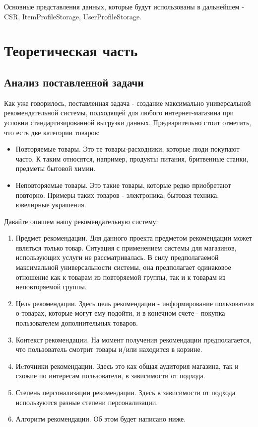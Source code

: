 \documentclass[14pt]{mmcs_article}
\begin{document}
Основные представления данных, которые будут использованы в дальнейшем - CSR, ItemProfileStorage, UserProfileStorage.



\section{Теоретическая часть}\label{dsfs}
\subsection{Анализ поставленной задачи}
Как уже говорилось, поставленная задача - создание максимально универсальной рекомендательной системы, подходящей для любого интернет-магазина при условии стандартизированной выгрузки данных.
Предварительно стоит отметить, что есть две категории товаров:
\begin{itemize}
	\item Повторяемые товары. Это те товары-расходники, которые люди покупают часто. К таким относятся, например, продукты питания, бритвенные станки, предметы бытовой химии.
	\item  Неповторяемые товары. Это такие товары, которые редко приобретают повторно. Примеры таких товаров - электроника, бытовая техника, ювелирные украшения.
\end{itemize}
Давайте опишем нашу рекомендательную систему: \cite{stud:kimfalk1}
\begin{enumerate}
\item Предмет рекомендации. Для данного проекта предметом рекомендации может являться только товар. Ситуация с применением системы для магазинов, использующих услуги не рассматривалась. В силу предполагаемой максимальной универсальности системы, она предполагает одинаковое отношение как к товарам из повторяемой группы, так и к товарам из неповторяемой группы.
\item Цель рекомендации. Здесь цель рекомендации - информирование пользователя о товарах, которые могут ему подойти, и в конечном счете - покупка пользователем дополнительных товаров.
\item Контекст рекомендации. На момент получения рекомендации предполагается, что пользователь смотрит товары и/или находится в корзине.
\item Иcточники рекомендации. Здесь это как общая аудитория магазина, так и схожие по интересам пользователи, в зависимости от подхода.
\item Степень персонализации рекомендации. Здесь в зависимости от подхода используются разные степени персонализации.
\item Алгоритм рекомендации. Об этом будет написано ниже. 
\end{enumerate}
\end{document}
